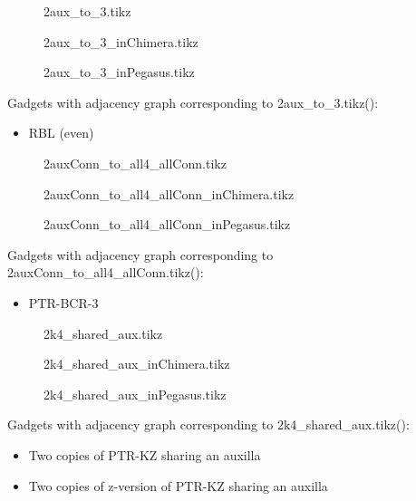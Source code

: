 \documentclass{article}
\begin{document}
\begin{figure}

\caption{2aux\_to\_3.tikz}
\end{figure}


\begin{figure}

\caption{2aux\_to\_3\_inChimera.tikz}
\end{figure}

\begin{figure}

\caption{2aux\_to\_3\_inPegasus.tikz}
\end{figure}



Gadgets with adjacency graph corresponding to 2aux\_to\_3.tikz(\scalebox{.25}{}):


\begin{itemize}
\item RBL (even)
\end{itemize}

\begin{figure}

\caption{2auxConn\_to\_all4\_allConn.tikz}
\end{figure}

\begin{figure}

\caption{2auxConn\_to\_all4\_allConn\_inChimera.tikz}
\end{figure}

\begin{figure}

\caption{2auxConn\_to\_all4\_allConn\_inPegasus.tikz}
\end{figure}

Gadgets with adjacency graph corresponding to 2auxConn\_to\_all4\_allConn.tikz(\scalebox{.25}{}):

\begin{itemize}
\item PTR-BCR-3
\end{itemize}

\begin{figure}

\caption{2k4\_shared\_aux.tikz}
\end{figure}

\begin{figure}

\caption{2k4\_shared\_aux\_inChimera.tikz}
\end{figure}

\begin{figure}

\caption{2k4\_shared\_aux\_inPegasus.tikz}
\end{figure}

Gadgets with adjacency graph corresponding to 2k4\_shared\_aux.tikz(\scalebox{.25}{}):

\begin{itemize}
\item Two copies of PTR-KZ sharing an auxilla
\item Two copies of z-version of PTR-KZ sharing an auxilla
\end{itemize}
\end{document}
